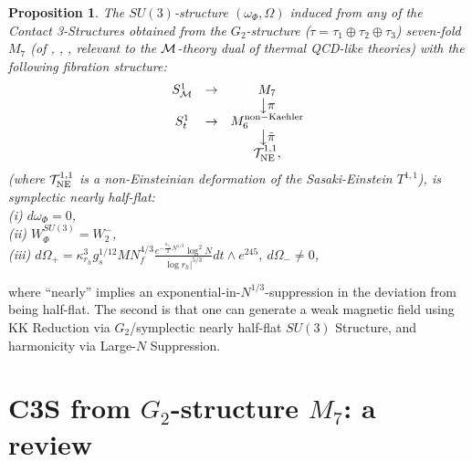 \documentclass[a4paper,11pt,fleqn]{article}
\theoremstyle{plain}
\newtheorem{proposition}[theorem]{Proposition}
\theoremstyle{definition}
\begin{document}
\begin{proposition}
The $SU(3)$-structure $(\omega_\Phi, \Omega)$ induced from any of the Contact 3-Structures obtained from the $G_2$-structure ($\tau = \tau_1\oplus\tau_2\oplus\tau_3$) seven-fold $M_7$ (of \cite{MQGP}, \cite{OR4}, \cite{ACMS}, relevant to the ${\cal M}$-theory dual of thermal QCD-like theories) with the following fibration structure:
\begin{equation}
\begin{array}{ccc}
    S^1_{\cal M} & \rightarrow & M_7 \\
     & & \big\downarrow\pi \\
     S^1_t & \rightarrow & M_6^{\rm non-Kaehler} \\
           &             & \big\downarrow \tilde{\pi} \\
           &             & {\cal T}^{1,1}_{\rm NE},
\end{array}
\end{equation}
(where ${\cal T}^{1,1}_{\rm NE}$ is a non-Einsteinian deformation of the Sasaki-Einstein $T^{1,1}$), is symplectic nearly half-flat: \\
(i) $d\omega_\Phi=0$,\\
(ii) $W_\Phi^{SU(3)} = W_2^-$, \\
(iii) $d\Omega_+= \kappa_{r_h}^3g_s^{1/12}M N_f^{4/3}\frac{e^{-\frac{\kappa_{r_h}}{2}N^{1/3}}\log^2N}{\log r_h|^{5/3}}dt\wedge e^{245},\ d\Omega_-\neq0$,
\end{proposition}
where ``nearly'' implies an exponential-in-$N^{1/3}$-suppression in the deviation from being half-flat. 
The second is that one can generate a weak magnetic field using KK Reduction via $G_2$/symplectic nearly half-flat $SU(3)$ Structure, and harmonicity via Large-$N$ Suppression.

\section{C3S from $G_2$-structure $M_7$: a review}
\label{C3S-Review}
\end{document}
